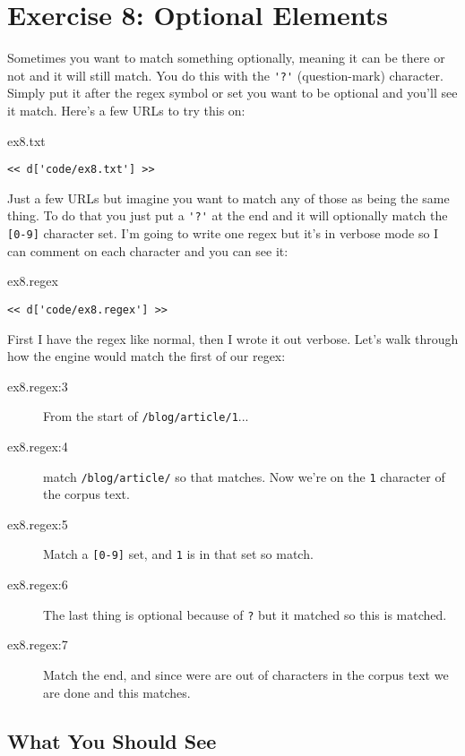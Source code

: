 \chapter{Exercise 8: Optional Elements}

Sometimes you want to match something optionally, meaning it can be there or
not and it will still match.  You do this with the \verb|'?'| (question-mark)
character.  Simply put it after the regex symbol or set you want to be optional
and you'll see it match.  Here's a few URLs to try this on:

\begin{code}{ex8.txt}
\begin{Verbatim}
<< d['code/ex8.txt'] >>
\end{Verbatim}
\end{code}

Just a few URLs but imagine you want to match any of those as being the same
thing.  To do that you just put a \verb|'?'| at the end and it will optionally
match the \verb|[0-9]| character set.  I'm going to write one regex but it's
in verbose mode so I can comment on each character and you can see it:

\begin{code}{ex8.regex}
\begin{Verbatim}
<< d['code/ex8.regex'] >>
\end{Verbatim}
\end{code}

First I have the regex like normal, then I wrote it out verbose.  Let's
walk through how the engine would match the first of our regex:

\begin{description}
\item[ex8.regex:3] From the start of \verb|/blog/article/1|...
\item[ex8.regex:4] match \verb|/blog/article/| so that matches.  Now
    we're on the \verb|1| character of the corpus text.
\item[ex8.regex:5] Match a \verb|[0-9]| set, and \verb|1| is in that set
    so match.
\item[ex8.regex:6] The last thing is optional because of \verb|?| but
    it matched so this is matched.
\item[ex8.regex:7] Match the end, and since were are out of characters
    in the corpus text we are done and this matches.
\end{description}

\section{What You Should See}


